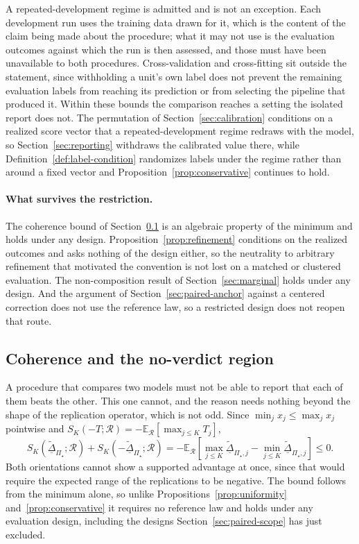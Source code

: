 \documentclass[11pt]{article}
\newcommand{\Regime}{\mathcal{R}}
\newcommand{\PSet}{\Pi_\star}
\newcommand{\E}{\mathbb{E}}
\newcommand{\RobDta}{\underline{\widetilde{\Delta}}_{\PSet}}
\theoremstyle{remark}
\begin{document}
A repeated-development regime is admitted and is not an exception. Each development run uses the training data drawn for it, which is the content of the claim being made about the procedure; what it may not use is the evaluation outcomes against which the run is then assessed, and those must have been unavailable to both procedures. Cross-validation and cross-fitting sit outside the statement, since withholding a unit's own label does not prevent the remaining evaluation labels from reaching its prediction or from selecting the pipeline that produced it. Within these bounds the comparison reaches a setting the isolated report does not. The permutation of Section~\ref{sec:calibration} conditions on a realized score vector that a repeated-development regime redraws with the model, so Section~\ref{sec:reporting} withdraws the calibrated value there, while Definition~\ref{def:label-condition} randomizes labels under the regime rather than around a fixed vector and Proposition~\ref{prop:conservative} continues to hold.

\paragraph{What survives the restriction.}
The coherence bound of Section~\ref{sec:orientation} is an algebraic property of the minimum and holds under any design. Proposition~\ref{prop:refinement} conditions on the realized outcomes and asks nothing of the design either, so the neutrality to arbitrary refinement that motivated the convention is not lost on a matched or clustered evaluation. The non-composition result of Section~\ref{sec:marginal} holds under any design. And the argument of Section~\ref{sec:paired-anchor} against a centered correction does not use the reference law, so a restricted design does not reopen that route.

\subsection{Coherence and the no-verdict region}
\label{sec:orientation}

A procedure that compares two models must not be able to report that each of them beats the other. This one cannot, and the reason needs nothing beyond the shape of the replication operator, which is not odd. Since $\min_j x_j\leq\max_j x_j$ pointwise and $S_K(-T;\Regime)=-\E_{\Regime}[\max_{j\leq K}T_j]$,
\begin{equation}
S_K(\RobDta;\Regime)
+
S_K(-\RobDta;\Regime)
=
-\E_{\Regime}
\left[
\max_{j\leq K}\underline{\widetilde{\Delta}}_{\PSet,j}-\min_{j\leq K}\underline{\widetilde{\Delta}}_{\PSet,j}
\right]
\leq
0 .
\label{eq:orientation}
\end{equation}
Both orientations cannot show a supported advantage at once, since that would require the expected range of the replications to be negative. The bound follows from the minimum alone, so unlike Propositions~\ref{prop:uniformity} and~\ref{prop:conservative} it requires no reference law and holds under any evaluation design, including the designs Section~\ref{sec:paired-scope} has just excluded.
\end{document}
